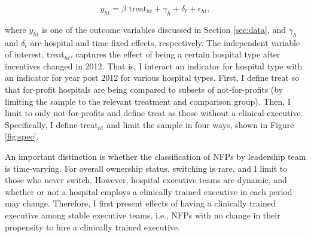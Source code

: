 \documentclass[12pt]{article}
\begin{document}
    \begin{equation}
    \label{eq:forprofit}
    y_{ht} = \beta \text{ treat}_{ht} + \gamma_{h} + \delta_t + \epsilon_{ht},
    \end{equation}
    

    \noindent where $y_{ht}$ is one of the outcome variables discussed in Section \ref{sec:data}, and $\gamma_h$ and $\delta_t$ are hospital and time fixed effects, respectively. The independent variable of interest, treat$_{ht}$, captures the effect of being a certain hospital type after incentives changed in 2012. That is, I interact an indicator for hospital type with an indicator for year post 2012 for various hospital types. First, I define treat so that for-profit hospitals are being compared to subsets of not-for-profits (by limiting the sample to the relevant treatment and comparison group). Then, I limit to only not-for-profits and define treat as those without a clinical executive. Specifically, I define treat$_{ht}$ and limit the sample in four ways, shown in Figure \ref{fig:spec}. 

    An important distinction is whether the classification of NFPs by leadership team is time-varying. For overall ownership status, switching is rare, and I limit to those who never switch. However, hospital executive teams are dynamic, and whether or not a hospital employs a clinically trained executive in each period may change. Therefore, I first present effects of having a clinically trained executive among stable executive teams, i.e., NFPs with no change in their propensity to hire a clinically trained executive. 
\end{document}
